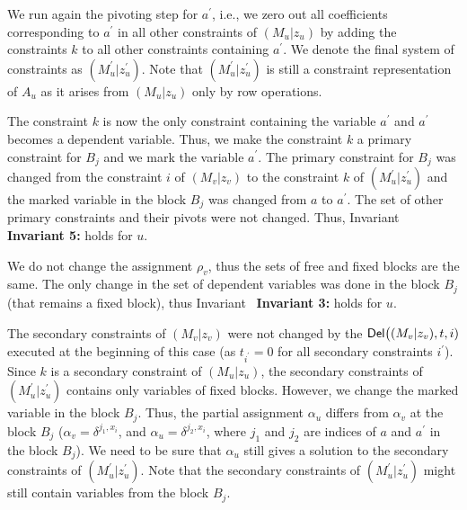 We run again the pivoting step for $a^{\prime}$, i.e., we zero out all coefficients corresponding to $a^{\prime}$ in all other constraints of $(M_{u}|z_{u})$ by adding the constraints $k$ to all other constraints containing $a^{\prime}$.
We denote the final system of constraints as $(M^{\prime}_{u}|z^{\prime}_{u})$.
Note that $(M^{\prime}_{u}|z^{\prime}_{u})$ is still a constraint representation of $A_{u}$ as it arises from $(M_{u}|z_{u})$ only by row operations.\par




The constraint $k$ is now the only constraint containing the variable $a^{\prime}$ and $a^{\prime}$ becomes a dependent variable.
Thus, we make the constraint $k$ a primary constraint for $B_{j}$ and we mark the variable $a^{\prime}$.
The primary constraint for $B_{j}$ was changed from the constraint $i$ of $(M_{v}|z_{v})$ to the constraint $k$ of $(M^{\prime}_{u}|z^{\prime}_{u})$ and the marked variable in the block $B_{j}$ was changed from $a$ to $a^{\prime}$.
The set of other primary constraints and their pivots were not changed.
Thus, Invariant \textbf{ Invariant 5:} holds for $u$.\par




We do not change the assignment $\rho_{v}$, thus the sets of free and fixed blocks are the same.
The only change in the set of dependent variables was done in the block $B_{j}$ (that remains a fixed block), thus Invariant \textbf{ Invariant 3:} holds for $u$.\par




The secondary constraints of $(M_{v}|z_{v})$ were not changed by the $\mathsf{Del}\bigl{(}(M_{v}|z_{v}),t,i)$ executed at the beginning of this case (as $t_{i^{\prime}}=0$ for all secondary constraints $i^{\prime}$).
Since $k$ is a secondary constraint of $(M_{u}|z_{u})$, the secondary constraints of $(M^{\prime}_{u}|z^{\prime}_{u})$ contains only variables of fixed blocks.
However, we change the marked variable in the block $B_{j}$.
Thus, the partial assignment $\alpha_{u}$ differs from $\alpha_{v}$ at the block $B_{j}$ ($\alpha_{v}=\delta^{j_{1},x_{i}}$, and $\alpha_{u}=\delta^{j_{2},x_{i}}$, where $j_{1}$ and $j_{2}$ are indices of $a$ and $a^{\prime}$ in the block $B_{j}$).
We need to be sure that $\alpha_{u}$ still gives a solution to the secondary constraints of $(M^{\prime}_{u}|z^{\prime}_{u})$.
Note that the secondary constraints of $(M^{\prime}_{u}|z^{\prime}_{u})$ might still contain variables from the block $B_{j}$.\par




